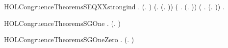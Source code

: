 \newcommand{\HOLCongruenceTheoremsSEQXXrules}{\UseVerbatim{HOLCongruenceTheoremsSEQXXrules}}
\begin{SaveVerbatim}{HOLCongruenceTheoremsSEQXXstrongind}
\HOLTokenTurnstile{} \HOLSymConst{\HOLTokenForall{}}.
        (\HOLTokenLambda{}. ) \HOLSymConst{\HOLTokenConj{}} (\HOLSymConst{\HOLTokenForall{}}.  (\HOLTokenLambda{}. )) \HOLSymConst{\HOLTokenConj{}}
       (\HOLSymConst{\HOLTokenForall{}} .   \HOLSymConst{\HOLTokenConj{}}   \HOLSymConst{\HOLTokenImp{}}  (\HOLTokenLambda{}.  )) \HOLSymConst{\HOLTokenConj{}}
       (\HOLSymConst{\HOLTokenForall{}} .
              \HOLSymConst{\HOLTokenConj{}}   \HOLSymConst{\HOLTokenConj{}}   \HOLSymConst{\HOLTokenConj{}}   \HOLSymConst{\HOLTokenImp{}}
             (\HOLTokenLambda{}.   \HOLSymConst{\ensuremath{+}}  )) \HOLSymConst{\HOLTokenImp{}}
       \HOLSymConst{\HOLTokenForall{}}.   \HOLSymConst{\HOLTokenImp{}}  
\end{SaveVerbatim}
\newcommand{\HOLCongruenceTheoremsSEQXXstrongind}{\UseVerbatim{HOLCongruenceTheoremsSEQXXstrongind}}
\begin{SaveVerbatim}{HOLCongruenceTheoremsSGOne}
\HOLTokenTurnstile{} \HOLSymConst{\HOLTokenForall{}}.  (\HOLTokenLambda{}. )
\end{SaveVerbatim}
\newcommand{\HOLCongruenceTheoremsSGOne}{\UseVerbatim{HOLCongruenceTheoremsSGOne}}
\begin{SaveVerbatim}{HOLCongruenceTheoremsSGOneZero}
\HOLTokenTurnstile{} \HOLSymConst{\HOLTokenForall{}} .  (\HOLTokenLambda{}. \HOLConst{\ensuremath{\tau}}  \HOLSymConst{\ensuremath{+}} \HOLConst{\ensuremath{\tau}} ) \HOLSymConst{\HOLTokenImp{}}   \HOLSymConst{\HOLTokenConj{}}  
\end{SaveVerbatim}
